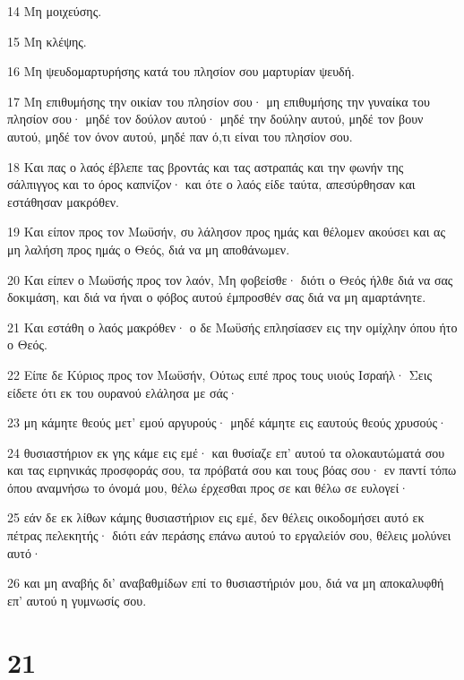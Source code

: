 \par 14 Μη μοιχεύσης.
\par 15 Μη κλέψης.
\par 16 Μη ψευδομαρτυρήσης κατά του πλησίον σου μαρτυρίαν ψευδή.
\par 17 Μη επιθυμήσης την οικίαν του πλησίον σου· μη επιθυμήσης την γυναίκα του πλησίον σου· μηδέ τον δούλον αυτού· μηδέ την δούλην αυτού, μηδέ τον βουν αυτού, μηδέ τον όνον αυτού, μηδέ παν ό,τι είναι του πλησίον σου.
\par 18 Και πας ο λαός έβλεπε τας βροντάς και τας αστραπάς και την φωνήν της σάλπιγγος και το όρος καπνίζον· και ότε ο λαός είδε ταύτα, απεσύρθησαν και εστάθησαν μακρόθεν.
\par 19 Και είπον προς τον Μωϋσήν, συ λάλησον προς ημάς και θέλομεν ακούσει και ας μη λαλήση προς ημάς ο Θεός, διά να μη αποθάνωμεν.
\par 20 Και είπεν ο Μωϋσής προς τον λαόν, Μη φοβείσθε· διότι ο Θεός ήλθε διά να σας δοκιμάση, και διά να ήναι ο φόβος αυτού έμπροσθέν σας διά να μη αμαρτάνητε.
\par 21 Και εστάθη ο λαός μακρόθεν· ο δε Μωϋσής επλησίασεν εις την ομίχλην όπου ήτο ο Θεός.
\par 22 Είπε δε Κύριος προς τον Μωϋσήν, Ούτως ειπέ προς τους υιούς Ισραήλ· Σεις είδετε ότι εκ του ουρανού ελάλησα με σάς·
\par 23 μη κάμητε θεούς μετ' εμού αργυρούς· μηδέ κάμητε εις εαυτούς θεούς χρυσούς·
\par 24 θυσιαστήριον εκ γης κάμε εις εμέ· και θυσίαζε επ' αυτού τα ολοκαυτώματά σου και τας ειρηνικάς προσφοράς σου, τα πρόβατά σου και τους βόας σου· εν παντί τόπω όπου αναμνήσω το όνομά μου, θέλω έρχεσθαι προς σε και θέλω σε ευλογεί·
\par 25 εάν δε εκ λίθων κάμης θυσιαστήριον εις εμέ, δεν θέλεις οικοδομήσει αυτό εκ πέτρας πελεκητής· διότι εάν περάσης επάνω αυτού το εργαλείόν σου, θέλεις μολύνει αυτό·
\par 26 και μη αναβής δι' αναβαθμίδων επί το θυσιαστήριόν μου, διά να μη αποκαλυφθή επ' αυτού η γυμνωσίς σου.

\chapter{21}

